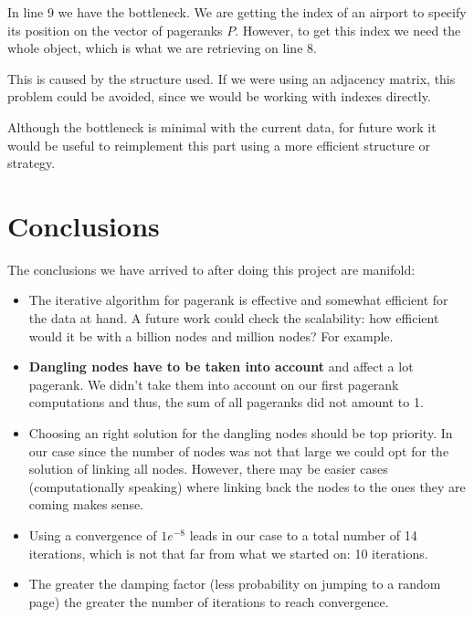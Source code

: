\documentclass[10pt, a4paper]{article}
\begin{document}
In line 9 we have the bottleneck. We are getting the index of an airport to specify its position on the vector of pageranks $P$. However, to get this index we need the whole object, which is what we are retrieving on line 8.

This is caused by the structure used. If we were using an adjacency matrix, this problem could be avoided, since we would be working with indexes directly.

Although the bottleneck is minimal with the current data, for future work it would be useful to reimplement this part using a more efficient structure or strategy.

\section{Conclusions}
The conclusions we have arrived to after doing this project are manifold:
\begin{itemize}
    \item The iterative algorithm for pagerank is effective and somewhat efficient for the data at hand. A future work could check the scalability: how efficient would it be with a billion nodes and million nodes? For example.
    \item \textbf{Dangling nodes have to be taken into account} and affect a lot pagerank. We didn't take them into account on our first pagerank computations and thus, the sum of all pageranks did not amount to 1. 
    \item Choosing an right solution for the dangling nodes should be top priority. In our case since the number of nodes was not that large we could opt for the solution of linking all nodes. However, there may be easier cases (computationally speaking) where linking back the nodes to the ones they are coming makes sense.
    \item Using a convergence of $1e^{-8}$ leads in our case to a total number of 14 iterations, which is not that far from what we started on: 10 iterations.
    \item The greater the damping factor (less probability on jumping to a random page) the greater the number of iterations to reach convergence.
\end{itemize}

\nocite{*}


\end{document}
